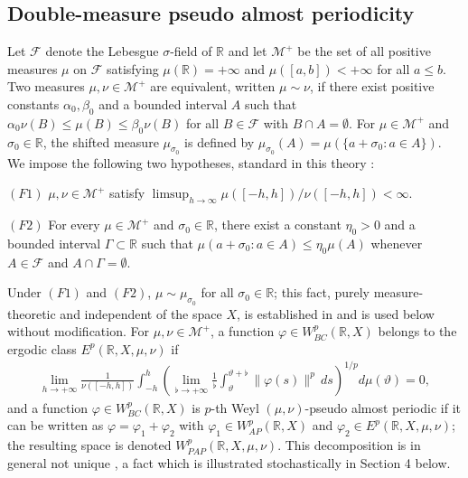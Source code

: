 \documentclass[11pt]{amsart}
\begin{document}
\subsection{Double-measure pseudo almost periodicity}

Let $\mathcal F$ denote the Lebesgue $\sigma$-field of $\mathbb R$ and let $\mathcal M^+$ be the set of all positive measures $\mu$ on $\mathcal F$ satisfying $\mu(\mathbb R)=+\infty$ and $\mu([a,b])<+\infty$ for all $a\le b$. Two measures $\mu,\nu\in\mathcal M^+$ are equivalent, written $\mu\sim\nu$, if there exist positive constants $\alpha_0,\beta_0$ and a bounded interval $A$ such that $\alpha_0\nu(B)\le\mu(B)\le\beta_0\nu(B)$ for all $B\in\mathcal F$ with $B\cap A=\emptyset$. For $\mu\in\mathcal M^+$ and $\sigma_0\in\mathbb R$, the shifted measure $\mu_{\sigma_0}$ is defined by $\mu_{\sigma_0}(A)=\mu(\{a+\sigma_0:a\in A\})$. We impose the following two hypotheses, standard in this theory \cite{BlotCieutatEzzinbi,DiaganaEzzinbiMiraoui}:

$(F1)$ $\mu,\nu\in\mathcal M^+$ satisfy $\limsup_{h\to\infty}\mu([-h,h])/\nu([-h,h])<\infty$.

$(F2)$ For every $\mu\in\mathcal M^+$ and $\sigma_0\in\mathbb R$, there exist a constant $\eta_0>0$ and a bounded interval $\Gamma\subset\mathbb R$ such that $\mu(a+\sigma_0:a\in A)\le\eta_0\mu(A)$ whenever $A\in\mathcal F$ and $A\cap\Gamma=\emptyset$.

Under $(F1)$ and $(F2)$, $\mu\sim\mu_{\sigma_0}$ for all $\sigma_0\in\mathbb R$; this fact, purely measure-theoretic and independent of the space $X$, is established in \cite{BlotCieutatEzzinbi} and is used below without modification. For $\mu,\nu\in\mathcal M^+$, a function $\varphi\in W^p_{BC}(\mathbb R,X)$ belongs to the ergodic class $E^p(\mathbb R,X,\mu,\nu)$ if
\begin{align*}
\lim_{h\to+\infty}\frac{1}{\nu([-h,h])}\int_{-h}^{h}\left(\lim_{\flat\to+\infty}\frac1\flat\int_{\vartheta}^{\vartheta+\flat}\|\varphi(s)\|^p\,ds\right)^{1/p}d\mu(\vartheta)=0,
\end{align*}
and a function $\varphi\in W^p_{BC}(\mathbb R,X)$ is $p$-th Weyl $(\mu,\nu)$-pseudo almost periodic if it can be written as $\varphi=\varphi_1+\varphi_2$ with $\varphi_1\in W^p_{AP}(\mathbb R,X)$ and $\varphi_2\in E^p(\mathbb R,X,\mu,\nu)$; the resulting space is denoted $W^p_{PAP}(\mathbb R,X,\mu,\nu)$. This decomposition is in general not unique \cite{LiWeyl}, a fact which is illustrated stochastically in Section 4 below.
\end{document}
